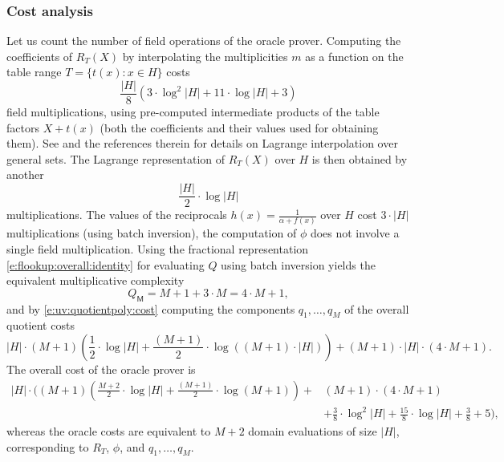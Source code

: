 \documentclass[11pt]{article}
\theoremstyle{definition}
\theoremstyle{definition}
\begin{document}
\subsubsection*{Cost analysis}

Let us count the number of field operations of the oracle prover.
Computing the coefficients of $R_T(X)$ by interpolating the multiplicities $m$ as a function on the table range $T=\{t(x) : x\in H\}$ costs 
\[
\frac{|H|}{8} \left(3\cdot \log^2|H| + 11\cdot\log|H| + 3 \right)
\] 
field multiplications, using pre-computed intermediate products of the table factors $X + t(x)$ (both the coefficients and their values used for obtaining them). 
See \cite{flookup} and the references therein for details on Lagrange interpolation over general sets.
The Lagrange representation of $R_T(X)$ over $H$ is then obtained by another 
\[
\frac{|H|}{2} \cdot \log |H|
\]
multiplications.
The values of the reciprocals $h(x) = \frac{1}{\alpha + f(x)}$ over $H$ cost $3\cdot |H|$ multiplications (using batch inversion), the computation of $\phi$ does not involve a single field multiplication.
Using the fractional representation \eqref{e:flookup:overall:identity} for evaluating $Q$ using batch inversion yields the equivalent multiplicative complexity
\[
Q_\mathsf M = M + 1 +3\cdot M = 4\cdot M + 1,
\]
and by \eqref{e:uv:quotientpoly:cost} computing the components $q_1, \ldots, q_M$ of the overall quotient costs 
\[
|H|\cdot (M+1) \left(\frac{1}{2} \cdot\log|H| + \frac{(M+1)}{2} \cdot\log((M+1)\cdot|H|) \right)+ (M+1)\cdot |H|\cdot (4\cdot M + 1). 
\]
The overall cost of the oracle prover is 
\begin{equation}
\label{e:uv:flookup:cost}
\begin{aligned}
|H|\cdot \Bigg((M+1) \left(\frac{M+2}{2} \cdot\log|H| + \frac{(M+1)}{2} \cdot\log(M+1) \right) + &(M+1) \cdot (4\cdot M + 1)
\\
&+ \frac{3}{8}\cdot \log^2|H| + \frac{15}{8}\cdot\log|H| + \frac{3}{8} + 5
\Bigg),
\end{aligned}
\end{equation}
whereas the oracle costs are equivalent to $M+2$ domain evaluations of size $|H|$, corresponding to $R_T$, $\phi$, and $q_1, \ldots, q_M$.
\end{document}
